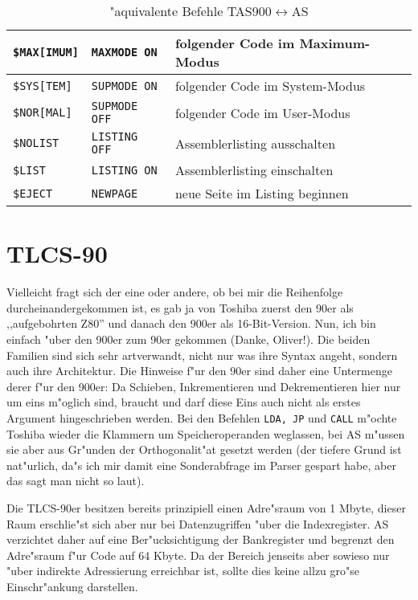 \documentclass[12pt,a4paper,twoside]{report}
\newcommand{\tty}[1]{{\tt #1}}
\begin{document}
{\begin{table*}[htbp]
\begin{center}
\begin{tabular}{|l|l|l|}
\hline
\tty{\$MAX[IMUM]}   & \tty{MAXMODE ON}          & folgender Code im Maximum-Modus \\
\hline
\tty{\$SYS[TEM]}    & \tty{SUPMODE ON}          & folgender Code im System-Modus \\
\hline
\tty{\$NOR[MAL]}    & \tty{SUPMODE OFF}         & folgender Code im User-Modus \\
\hline
\tty{\$NOLIST}      & \tty{LISTING OFF}         & Assemblerlisting ausschalten \\
\hline
\tty{\$LIST}        & \tty{LISTING ON}          & Assemblerlisting einschalten \\
\hline
\tty{\$EJECT}       & \tty{NEWPAGE}             & neue Seite im Listing beginnen \\
\hline
\end{tabular}\end{center}
\caption{"aquivalente Befehle TAS900$\leftrightarrow$AS\label{TabTAS900}}
\end{table*}


\section{TLCS-90}

Vielleicht fragt sich der eine oder andere, ob bei mir die Reihenfolge
durcheinandergekommen ist, es gab ja von Toshiba zuerst den 90er als
,,aufgebohrten Z80'' und danach den 900er als 16-Bit-Version.  Nun, ich
bin einfach "uber den 900er zum 90er gekommen (Danke, Oliver!).  Die
beiden Familien sind sich sehr artverwandt, nicht nur was ihre Syntax
angeht, sondern auch ihre Architektur.  Die Hinweise f"ur den 90er sind
daher eine Untermenge derer f"ur den 900er: Da Schieben, Inkrementieren
und Dekrementieren hier nur um eins m"oglich sind, braucht und darf diese
Eins auch nicht als erstes Argument hingeschrieben werden.  Bei den
Befehlen \tty{LDA, JP} und \tty{CALL} m"ochte Toshiba wieder die
Klammern um Speicheroperanden weglassen, bei AS m"ussen sie aber aus
Gr"unden der Orthogonalit"at gesetzt werden (der tiefere Grund ist
nat"urlich, da"s ich mir damit eine Sonderabfrage im Parser gespart habe,
aber das sagt man nicht so laut).
\par
Die TLCS-90er besitzen bereits prinzipiell einen Adre"sraum von 1
Mbyte, dieser Raum erschlie"st sich aber nur bei Datenzugriffen "uber
die Indexregister.  AS verzichtet daher auf eine Ber"ucksichtigung
der Bankregister und begrenzt den Adre"sraum f"ur Code auf 64 Kbyte.
Da der Bereich jenseits aber sowieso nur "uber indirekte Adressierung
erreichbar ist, sollte dies keine allzu gro"se Einschr"ankung darstellen.

}
\end{document}
